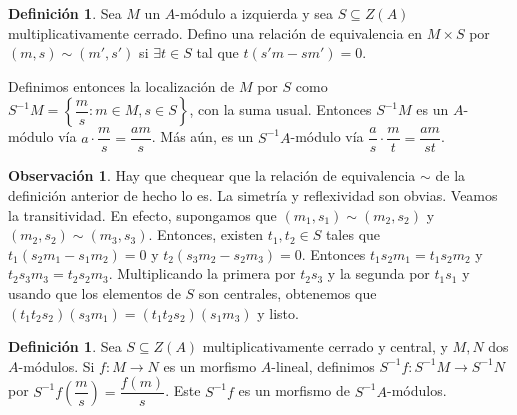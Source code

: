 \documentclass[12pt]{book}
\theoremstyle{definition}
\newtheorem{obs}[teo]{Observación}
\newtheorem{defn}[teo]{Definición}
\begin{document}
\begin{defn}
Sea $M$ un $A$-módulo a izquierda y sea $S\subseteq Z(A)$ multiplicativamente cerrado. Defino una relación de equivalencia en $M\times S$ por $(m,s)\sim (m',s')$ si $\exists t\in S$ tal que $t(s'm - sm')=0$.

Definimos entonces la localización de $M$ por $S$ como $S^{-1}M = \left\{ \dfrac{m}{s} : m\in M, s\in S\right\}$, con la suma usual. Entonces $S^{-1}M$ es un $A$-módulo vía $a\cdot \dfrac{m}{s} = \dfrac{am}{s}$. Más aún, es un $S^{-1}A$-módulo vía $\dfrac{a}{s}\cdot \dfrac{m}{t} = \dfrac{am}{st}$.
\end{defn}

\begin{obs}
Hay que chequear que la relación de equivalencia $\sim$ de la definición anterior de hecho lo es. La simetría y reflexividad son obvias. Veamos la transitividad.	En efecto, supongamos que $(m_1,s_1)\sim (m_2,s_2)$ y $(m_2,s_2)\sim (m_3,s_3)$. Entonces, existen $t_1,t_2\in S$ tales que $t_1(s_2m_1 - s_1m_2)=0$ y $t_2(s_3m_2 - s_2m_3)=0$. Entonces $t_1s_2m_1=t_1s_2m_2$ y $t_2s_3m_3 = t_2s_2m_3$. Multiplicando la primera por $t_2s_3$ y la segunda por $t_1s_1$ y usando que los elementos de $S$ son centrales, obtenemos que $(t_1t_2s_2)(s_3m_1) = (t_1t_2s_2)(s_1m_3)$ y listo.
\end{obs}

\begin{defn}
Sea $S\subseteq Z(A)$ multiplicativamente cerrado y central, y $M,N$ dos $A$-módulos. Si $f:M\to N$ es un morfismo $A$-lineal, definimos $S^{-1}f:S^{-1}M\to S^{-1}N$ por $S^{-1}f\left(\dfrac{m}{s}\right) = \dfrac{f(m)}{s}$. Este $S^{-1}f$ es un morfismo de $S^{-1}A$-módulos.
\end{defn}
\end{document}
